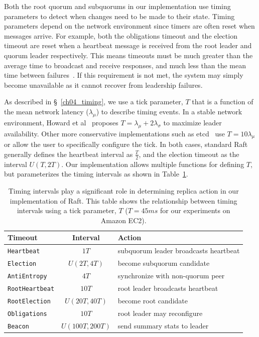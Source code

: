 Both the root quorum and subquorums in our implementation use timing parameters to detect when changes need to be made to their state.
Timing parameters depend on the network environment since timers are often reset when messages arrive.
For example, both the obligations timeout and the election timeout are reset when a heartbeat message is received from the root leader and quorum leader respectively.
This means timeouts must be much greater than the average time to broadcast and receive responses, and much less than the mean time between failures~\cite{raft,etcd_raft,oliveira_evaluating_2016}.
If this requirement is not met, the system may simply become unavailable as it cannot recover from leadership failures.

As described in \S~\ref{ch04_timing}, we use a tick parameter, $T$ that is a function of the mean network latency ($\lambda_{\mu}$) to describe timing events.
In a stable network environment, Howard et al~\cite{raft_refloated} proposes  $T=\lambda_{\mu}+2\lambda_{\sigma}$ to maximize leader availability.
Other more conservative implementations such as etcd~\cite{etcd_raft} use $T=10\lambda_\mu$ or allow the user to specifically configure the tick.
In both cases, standard Raft generally defines the heartbeat interval as $\frac{T}{2}$, and the election timeout as the interval $U(T,2T)$.
Our implementation allows multiple functions for defining $T$, but parameterizes the timing intervals as shown in Table~\ref{tab:ticks}.

\renewcommand{\baselinestretch}{1}
\small\normalsize
 \begin{table}[t!]
\caption[Parameterized Timeouts of HC Implementation]{Timing intervals play a significant role in determining replica action in our implementation of Raft. This table shows the relationship between timing intervals using a tick parameter, $T$ ($T=45 ms$ for our experiments on Amazon EC2).}
\begin{center}
\begin{tabular}{l|c|l}
\hline
Timeout & Interval & Action \\
\hline \hline
\texttt{Heartbeat} & $1T$ & subquorum leader broadcasts heartbeat\\
\texttt{Election} & $U(2T,4T)$ & become subquorum candidate \\
\texttt{AntiEntropy} & $4T$ & synchronize with non-quorum peer \\ \hline
\texttt{RootHeartbeat} & $10T$ & root leader broadcasts heartbeat \\
\texttt{RootElection} & $U(20T,40T)$ & become root candidate \\ \hline
\texttt{Obligations} & $10T$ & root leader may reconfigure \\
\texttt{Beacon} & $U(100T,200T)$ & send summary stats to leader \\
\hline
\end{tabular}
\end{center}
\label{tab:ticks}
\end{table}
 \renewcommand{\baselinestretch}{2}
\small\normalsize

